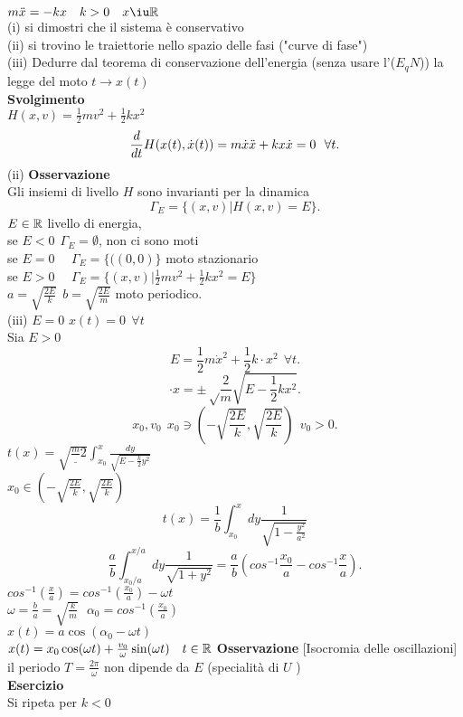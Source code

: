 \documentclass[12px]{article}
\begin{document}
$m \ddot x = -k x \ \ \ k > 0 \ \ \ x\iu \R$\\
(i) si dimostri che il sistema è conservativo\\
(ii) si trovino le traiettorie nello spazio delle fasi ("curve di fase")\\
(iii) Dedurre dal teorema di conservazione dell'energia (senza usare l'($E_qN$)) la legge del moto $t \rightarrow x(t)$\\
\textbf{Svolgimento}\\
$H(x,v) = \frac 12 mv^2 + \frac 12 k x^2$\\
 \[
	 \frac{d }{d t}H(x(t),\dot x(t)) = m\dot x\ddot x + kx\dot x = 0 \ \ \forall t
.\] 
(ii)
\textbf{Osservazione}\\
Gli insiemi di livello $H$ sono invarianti per la dinamica
\[
	\Gamma_E = \{(x,v) | H(x,v)=E\}
.\] 
$E\in\mathbb{R}$ livello di energia,\\
se $E< 0 \ \ \Gamma_E = \emptyset$, non ci sono moti\\
se  $E = 0$ \ \  $\Gamma_E = \{((0,0)\}$ moto stazionario\\
se $E > 0$ \ \  $\Gamma_E = \{(x,v) | \frac 12 mv^2 + \frac 12 kx^2 = E\}$ \\
$a = \sqrt{\frac{2E}k} \ \ b = \sqrt{\frac{2E}{m}}$ moto periodico.\\
(iii) $E = 0$  $x(t) = 0 \ \ \forall t$\\
Sia  $E > 0$
 \[
 E = \frac 12 m\dot x ^2 + \frac 12 k \cdot x^2 \ \ \forall t
.\] 
\[
	\cdot x = \pm\sqrt\frac 2m \sqrt{E-\frac 12kx^2}
.\] 
\[
	x_0,v_0 \ \ x_0\ni \left(-\sqrt{\frac{2E}{k}},\sqrt{\frac{2E}k} \right) \ \ v_0>0 
.\] 
$t(x) = \sqrt{\frac m_2}\int_{x_0}^x\frac{dy}{\sqrt{E-\frac k 2y^2}}$\\
$x_0\in \left(-\sqrt{\frac{2E}{k}},\sqrt{\frac{2E}k} \right)$
\[
t(x) = \frac 1b \int_{x_0}^x dy \frac{1}{\sqrt{1-\frac{y^2}{a^2}}}\]
\[
	\frac ab\int^{x/a}_{x_0/a}dy\frac{1}{\sqrt{1 + y^2}} = \frac ab (cos^{-1}\frac {x_0}a -cos^{-1}\frac xa)
.\] 
$cos^{-1}(\frac xa) = cos^{-1}(\frac {x_0}{a}) - \omega t$\\
$\omega = \frac ba = \sqrt{\frac km}\ \ \ \alpha_0 = cos^{-1}(\frac{ x_0}{a})$ \\
$x(t) = a\cos(\alpha_0 - \omega t)$\\
$x(t) = x_0\cos(\omega t) + \frac {v_0}\omega\sin(\omega t) \ \ \ t\in\mathbb{R}$
\textbf{Osservazione} [Isocromia delle oscillazioni]\\
il periodo $T = \frac {2\pi}\omega$ non dipende da $E$ (specialità di $U$ )\\
\textbf{Esercizio}\\
Si ripeta per $k < 0 $\\
\end{document}
